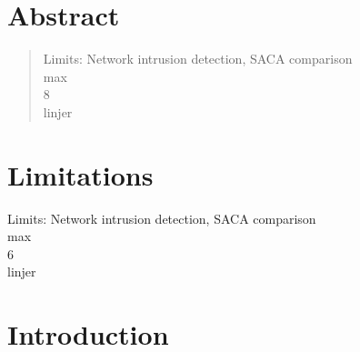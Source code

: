 \documentclass[12pt]{article} %
\begin{document}






\newpage %
\tableofcontents
\newpage

\renewcommand{\abstractname}{Special thanks to...} %
\section{Abstract}
\begin{abstract}
\noindent
Limits: Network intrusion detection, SACA comparison \\
max \\ 
8 \\
linjer 

\end{abstract}

\section{Limitations}
Limits: Network intrusion detection, SACA comparison \\
max \\
6 \\ 
linjer \\






\section{Introduction}
\end{document}
